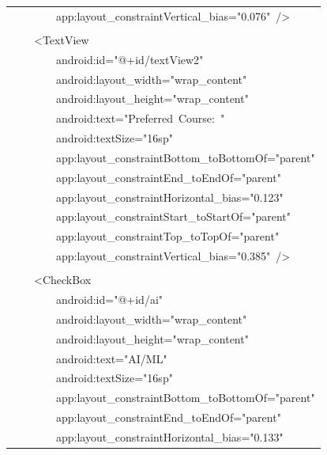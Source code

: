 \documentclass[a4paper,12pt]{article}
\begin{document}
\begin{longtable}{|p{}|}
{\ttfamily\small \ \ \ \ \ \ \ \ app:layout\_constraintVertical\_bias="0.076"\ /\textgreater{}} \\
\strut \\
{\ttfamily\small \ \ \ \ \textless{}TextView} \\
{\ttfamily\small \ \ \ \ \ \ \ \ android:id="@+id/textView2"} \\
{\ttfamily\small \ \ \ \ \ \ \ \ android:layout\_width="wrap\_content"} \\
{\ttfamily\small \ \ \ \ \ \ \ \ android:layout\_height="wrap\_content"} \\
{\ttfamily\small \ \ \ \ \ \ \ \ android:text="Preferred\ Course:\ "} \\
{\ttfamily\small \ \ \ \ \ \ \ \ android:textSize="16sp"} \\
{\ttfamily\small \ \ \ \ \ \ \ \ app:layout\_constraintBottom\_toBottomOf="parent"} \\
{\ttfamily\small \ \ \ \ \ \ \ \ app:layout\_constraintEnd\_toEndOf="parent"} \\
{\ttfamily\small \ \ \ \ \ \ \ \ app:layout\_constraintHorizontal\_bias="0.123"} \\
{\ttfamily\small \ \ \ \ \ \ \ \ app:layout\_constraintStart\_toStartOf="parent"} \\
{\ttfamily\small \ \ \ \ \ \ \ \ app:layout\_constraintTop\_toTopOf="parent"} \\
{\ttfamily\small \ \ \ \ \ \ \ \ app:layout\_constraintVertical\_bias="0.385"\ /\textgreater{}} \\
\strut \\
{\ttfamily\small \ \ \ \ \textless{}CheckBox} \\
{\ttfamily\small \ \ \ \ \ \ \ \ android:id="@+id/ai"} \\
{\ttfamily\small \ \ \ \ \ \ \ \ android:layout\_width="wrap\_content"} \\
{\ttfamily\small \ \ \ \ \ \ \ \ android:layout\_height="wrap\_content"} \\
{\ttfamily\small \ \ \ \ \ \ \ \ android:text="AI/ML"} \\
{\ttfamily\small \ \ \ \ \ \ \ \ android:textSize="16sp"} \\
{\ttfamily\small \ \ \ \ \ \ \ \ app:layout\_constraintBottom\_toBottomOf="parent"} \\
{\ttfamily\small \ \ \ \ \ \ \ \ app:layout\_constraintEnd\_toEndOf="parent"} \\
{\ttfamily\small \ \ \ \ \ \ \ \ app:layout\_constraintHorizontal\_bias="0.133"} \\

\end{longtable}
\end{document}
